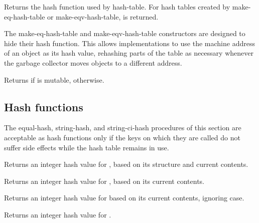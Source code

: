 \begin{entry}{}
Returns the hash function used by hash-table.  For hash tables created by {\cf make-eq-hash-table} or {\cf make-eqv-hash-table}, \schfalse{} is returned.

\begin{rationale}
The {\cf make-eq-hash-table} and {\cf make-eqv-hash-table} constructors
are designed to hide their hash function.  This allows implementations
to use the machine address of an object as its hash value, rehashing
parts of the table as necessary whenever the garbage collector moves
objects to a different address.
\end{rationale}
\end{entry}

\begin{entry}{}
Returns \schtrue{} if  is mutable, \schfalse{} otherwise.
\end{entry}

\subsection{Hash functions}

The {\cf equal-hash}, {\cf string-hash}, and {\cf string-ci-hash}
procedures of this section are acceptable as hash functions only
if the keys on which they are called do not suffer side effects
while the hash table remains in use.

\begin{entry}{}
Returns an integer hash value for , based on its structure and current contents.
\end{entry}

\begin{entry}{}
Returns an integer hash value for , based on its current contents.
\end{entry}

\begin{entry}{}
Returns an integer hash value for  based on its current contents, ignoring case.
\end{entry}

\begin{entry}{}
Returns an integer hash value for .
\end{entry}

